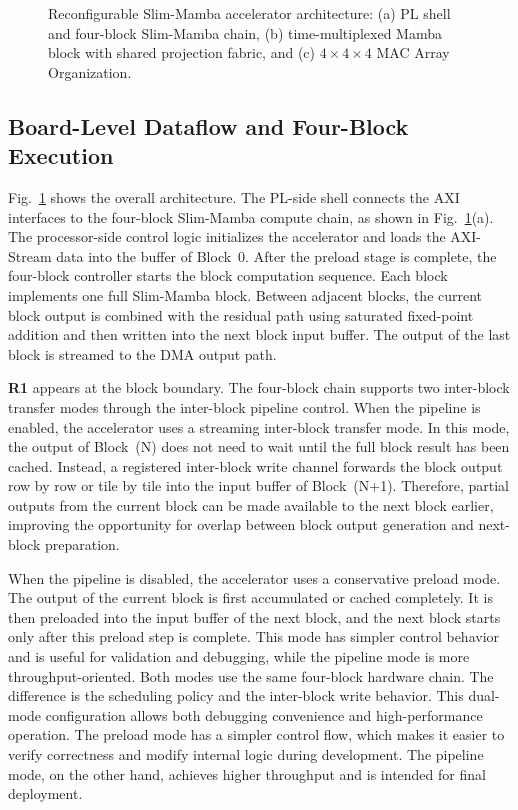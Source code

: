 \documentclass[lettersize,journal]{IEEEtran}
\begin{document}
\begin{figure}[!t]
\centering

\caption{Reconfigurable Slim-Mamba accelerator architecture: (a) PL shell and four-block Slim-Mamba
chain, (b) time-multiplexed Mamba block with shared projection fabric, and (c) $4\times4\times4$ MAC Array Organization.}
\label{fig:hardware_architecture}
\end{figure}

\subsection{Board-Level Dataflow and Four-Block Execution}

Fig.~\ref{fig:hardware_architecture} shows the overall architecture. The PL-side shell connects the AXI interfaces to the four-block Slim-Mamba
compute chain, as shown in Fig.~\ref{fig:hardware_architecture}(a). The processor-side control logic initializes the accelerator and loads the AXI-Stream
data into the buffer of Block~0. After the preload stage is complete, the four-block
controller starts the block computation sequence. Each block implements one full
Slim-Mamba block. Between adjacent blocks, the current block output is
combined with the residual path using saturated fixed-point addition and then
written into the next block input buffer. The output of the last block is
streamed to the DMA output path.

\textbf{R1} appears at the block boundary. The four-block
chain supports two inter-block transfer modes through the
inter-block pipeline control. When
the pipeline is enabled, the accelerator uses a streaming inter-block
transfer mode. In this mode, the output of Block~(N) does not need to wait
until the full block result has been cached. Instead, a registered inter-block
write channel forwards the block output row by row or tile by tile into the
input buffer of Block~(N+1). Therefore, partial outputs from the current block
can be made available to the next block earlier, improving the opportunity for
overlap between block output generation and next-block preparation.

When the pipeline is disabled, the accelerator uses a conservative
preload mode. The output of the current block is first accumulated or cached
completely. It is then preloaded into the input buffer of the next block, and
the next block starts only after this preload step is complete. This mode has
simpler control behavior and is useful for validation and debugging, while the
pipeline mode is more throughput-oriented. Both modes use the same four-block
hardware chain. The difference is the scheduling policy and the inter-block
write behavior. This dual-mode configuration allows both debugging convenience and high-performance operation. The preload mode has a simpler control flow, which makes it easier to verify correctness and modify internal logic during development. The pipeline mode, on the other hand, achieves higher throughput and is intended for final deployment.
\end{document}
